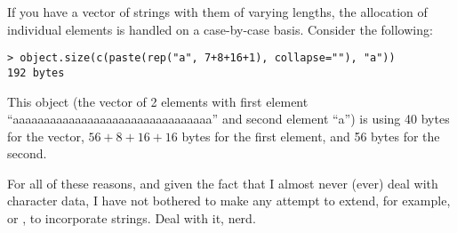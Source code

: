 If you have a vector of strings with them of varying lengths, the allocation of 
individual elements is handled on a case-by-case basis.  Consider the 
following:
\begin{lstlisting}[language=rr]
> object.size(c(paste(rep("a", 7+8+16+1), collapse=""), "a")) 
192 bytes
\end{lstlisting}

This object (the vector of 2 elements with first element 
``aaaaaaaaaaaaaaaaaaaaaaaaaaaaaaaa'' and second element ``a'') is using 40 
bytes for the vector, $56+8+16+16$ bytes for the first element, and 56 bytes for 
the second.

For all of these reasons, and given the fact that I almost never (ever) deal 
with character data, I have not bothered to make any attempt to extend, for 
example,  or , to incorporate strings.  Deal 
with it, nerd.